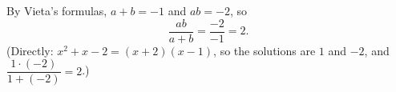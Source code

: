By Vieta's formulas, $a+b=-1$ and $ab=-2$, so
\[
\dfrac{ab}{a+b}=\dfrac{-2}{-1}=\boxed{2}.
\]
(Directly: $x^2+x-2=(x+2)(x-1)$, so the solutions are $1$ and $-2$, and $\dfrac{1\cdot(-2)}{1+(-2)}=2$.)
